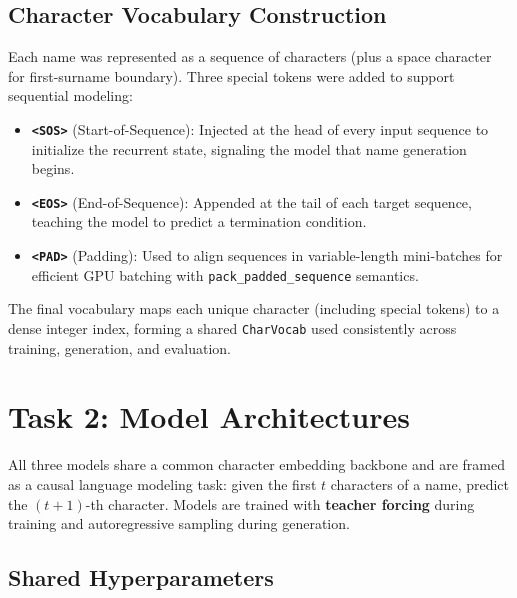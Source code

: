 \documentclass[11pt,a4paper]{article}
\begin{document}
\subsection{Character Vocabulary Construction}
Each name was represented as a sequence of characters (plus a space character for first-surname boundary). Three special tokens were added to support sequential modeling:

\begin{itemize}[label=\textcolor{iitjgold}{\textbullet}, itemsep=0.5em]
    \justifying
    \item \textbf{\texttt{<SOS>}} (Start-of-Sequence): Injected at the head of every input sequence to initialize the recurrent state, signaling the model that name generation begins.
    \item \textbf{\texttt{<EOS>}} (End-of-Sequence): Appended at the tail of each target sequence, teaching the model to predict a termination condition.
    \item \textbf{\texttt{<PAD>}} (Padding): Used to align sequences in variable-length mini-batches for efficient GPU batching with \texttt{pack\_padded\_sequence} semantics.
\end{itemize}

The final vocabulary maps each unique character (including special tokens) to a dense integer index, forming a shared \texttt{CharVocab} used consistently across training, generation, and evaluation.

\section{Task 2: Model Architectures}

All three models share a common character embedding backbone and are framed as a causal language modeling task: given the first $t$ characters of a name, predict the $(t{+}1)$-th character. Models are trained with \textbf{teacher forcing} during training and autoregressive sampling during generation.

\subsection{Shared Hyperparameters}
\end{document}
